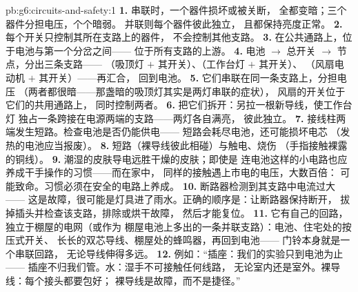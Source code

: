 \begin{solution}{pb:g6:circuits-and-safety:1}
\textbf{1.} 串联时，一个器件损坏或被关断，
全都变暗；三个器件分担电压，个个暗弱。
并联则每个器件彼此独立，
且都保持亮度正常。
\textbf{2.} 每个开关只控制其所在支路上的器件，
不会控制其他支路。
\textbf{3.} 在公共通路上，位于电池与第一个分岔之间——
位于所有支路的上游。
\textbf{4.} 电池 $\to$ 总开关 $\to$ 节点，分出三条支路——
（吸顶灯 $+$ 其开关）、（工作台灯 $+$ 其开关）、
（风扇电动机 $+$ 其开关）——再汇合，
回到电池。
\textbf{5.} 它们串联在同一条支路上，分担电压
（两者都很暗——那盏暗的吸顶灯其实是两灯串联的症状），
风扇的开关位于它们的共用通路上，
同时控制两者。
\textbf{6.} 把它们拆开：另拉一根新导线，使工作台灯
独占一条跨接在电源两端的支路——两灯各自满亮，
彼此独立。
\textbf{7.} 接线柱两端发生短路。检查电池是否仍能供电——
短路会耗尽电池，还可能损坏电芯
（发热的电池应当报废）。
\textbf{8.} 短路（裸导线彼此相碰）与触电、烧伤
（手指接触裸露的铜线）。
\textbf{9.} 潮湿的皮肤导电远胜干燥的皮肤；即使是
连电池这样的小电路也应养成干手操作的习惯——而在家中，
同样的接触遇上市电的电压，大数百倍：
可能致命。习惯必须在安全的电路上养成。
\textbf{10.} 断路器检测到其支路中电流过大——
这是故障，很可能是灯具进了雨水。正确的顺序是：让断路器保持断开，
拔掉插头并检查该支路，排除或烘干故障，
然后才能复位。
\textbf{11.} 它有自己的回路，独立于棚屋的电网（或作为
棚屋电池上多出的一条并联支路）：电池、住宅处的按压式开关、
长长的双芯导线、棚屋处的蜂鸣器，再回到电池——
门铃本身就是一个串联回路，
无论导线伸得多远。
\textbf{12.} 例如：“插座：我们的实验只到电池为止——
插座不归我们管。水：湿手不可接触任何线路，
无论室内还是室外。裸导线：每个接头都要包好；
裸导线是故障，而不是捷径。”
\end{solution}
